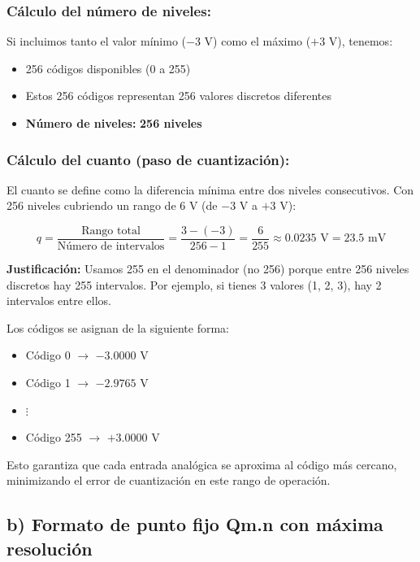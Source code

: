 \documentclass[12pt]{article}
\begin{document}
\subsubsection*{Cálculo del número de niveles:}
 
Si incluimos tanto el valor mínimo ($-3$ V) como el máximo ($+3$ V), tenemos:
\begin{itemize}
    \item 256 códigos disponibles (0 a 255)
    \item Estos 256 códigos representan 256 valores discretos diferentes
    \item \textbf{Número de niveles:} \textbf{256 niveles}
\end{itemize}
 
\subsubsection*{Cálculo del cuanto (paso de cuantización):}
 
El cuanto se define como la diferencia mínima entre dos niveles consecutivos. Con 256 niveles cubriendo un rango de 6 V (de $-3$ V a $+3$ V):
 
\begin{equation}
q = \frac{\text{Rango total}}{\text{Número de intervalos}} = \frac{3 - (-3)}{256 - 1} = \frac{6}{255} \approx 0.0235 \text{ V} = 23.5 \text{ mV}
\end{equation}
 
\textbf{Justificación:} Usamos 255 en el denominador (no 256) porque entre 256 niveles discretos hay 255 intervalos. Por ejemplo, si tienes 3 valores (1, 2, 3), hay 2 intervalos entre ellos.
 
Los códigos se asignan de la siguiente forma:
\begin{itemize}
    \item Código 0 $\rightarrow$ $-3.0000$ V
    \item Código 1 $\rightarrow$ $-2.9765$ V
    \item $\vdots$
    \item Código 255 $\rightarrow$ $+3.0000$ V
\end{itemize}
 
Esto garantiza que cada entrada analógica se aproxima al código más cercano, minimizando el error de cuantización en este rango de operación.
 
\subsection*{b) Formato de punto fijo Qm.n con máxima resolución}
 
\end{document}
